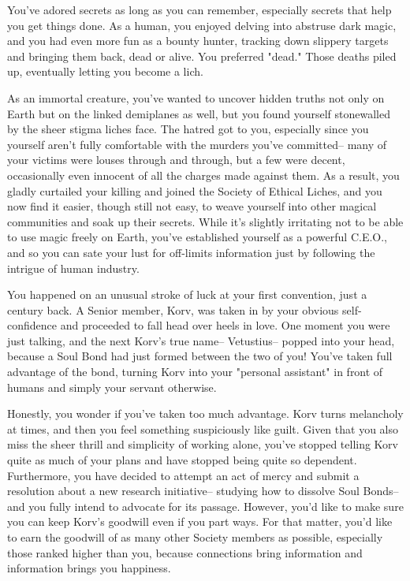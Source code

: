 \documentclass[char]{Sel}
\begin{document}
\name{\cLock{}}
You've adored secrets as long as you can remember, especially secrets that help you get things done. As a human, you enjoyed delving into abstruse dark magic, and you had even more fun as a bounty hunter, tracking down slippery targets and bringing them back, dead or alive. You preferred "dead." Those deaths piled up, eventually letting you become a lich.

As an immortal creature, you've wanted to uncover hidden truths not only on Earth but on the linked demiplanes as well, but you found yourself stonewalled by the sheer stigma liches face. The hatred got to you, especially since you yourself aren't fully comfortable with the murders you've committed-- many of your victims were louses through and through, but a few were decent, occasionally even innocent of all the charges made against them. As a result, you gladly curtailed your killing and joined the Society of Ethical Liches, and you now find it easier, though still not easy, to weave yourself into other magical communities and soak up their secrets. While it's slightly irritating not to be able to use magic freely on Earth, you've established yourself as a powerful C.E.O., and so you can sate your lust for off-limits information just by following the intrigue of human industry.

You happened on an unusual stroke of luck at your first convention, just a century back. A Senior member, Korv, was taken in by your obvious self-confidence and proceeded to fall head over heels in love. One moment you were just talking, and the next Korv’s true name-- Vetustius-- popped into your head, because a Soul Bond had just formed between the two of you! You've taken full advantage of the bond, turning Korv into your "personal assistant" in front of humans and simply your servant otherwise.

Honestly, you wonder if you've taken too much advantage. Korv turns melancholy at times, and then you feel something suspiciously like guilt. Given that you also miss the sheer thrill and simplicity of working alone, you've stopped telling Korv quite as much of your plans and have stopped being quite so dependent. Furthermore, you have decided to attempt an act of mercy and submit a resolution about a new research initiative-- studying how to dissolve Soul Bonds-- and you fully intend to advocate for its passage. However, you'd like to make sure you can keep Korv's goodwill even if you part ways. For that matter, you'd like to earn the goodwill of as many other Society members as possible, especially those ranked higher than you, because connections bring information and information brings you happiness.
\end{document}
